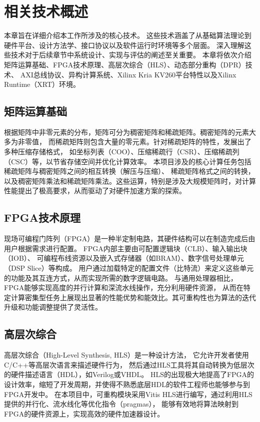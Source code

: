 \chapter{相关技术概述}

本章旨在详细介绍本工作所涉及的核心技术。
这些技术涵盖了从基础算法理论到硬件平台、设计方法学、接口协议以及软件运行时环境等多个层面。
深入理解这些技术对于后续章节中系统设计、实现与评估的阐述至关重要。
本章将依次介绍矩阵运算基础、FPGA技术原理、高层次综合（HLS）、动态部分重构（DPR）技术、
AXI总线协议、异构计算系统、Xilinx Kria KV260平台特性以及Xilinx Runtime（XRT）环境。

\section{矩阵运算基础}

根据矩阵中非零元素的分布，矩阵可分为稠密矩阵和稀疏矩阵。稠密矩阵的元素大多为非零值，
而稀疏矩阵则包含大量的零元素。针对稀疏矩阵的特性，发展出了多种压缩存储格式，
如坐标列表（COO）、压缩稀疏行（CSR）、压缩稀疏列（CSC）等，以节省存储空间并优化计算效率。
本项目涉及的核心计算任务包括稀疏矩阵与稠密矩阵之间的相互转换（解压与压缩）、
稀疏矩阵格式之间的转换，以及稠密矩阵乘法和稀疏矩阵乘法。这些运算，特别是涉及大规模矩阵时，对计算性能提出了极高要求，从而驱动了对硬件加速方案的探索。

\section{FPGA技术原理}

现场可编程门阵列（FPGA）是一种半定制电路，其硬件结构可以在制造完成后由用户根据需求进行配置。
FPGA内部主要由可配置逻辑块（CLB）、输入输出块（IOB）、
可编程布线资源以及嵌入式存储器（如BRAM）、数字信号处理单元（DSP Slice）等构成。
用户通过加载特定的配置文件（比特流）来定义这些单元的功能及其互连方式，从而实现所需的数字逻辑电路。
与通用处理器相比，FPGA能够实现高度的并行计算和深流水线操作，充分利用硬件资源，
从而在特定计算密集型任务上展现出显著的性能优势和能效比。其可重构性也为算法的迭代升级和功能调整提供了灵活性。

\section{高层次综合}

高层次综合（High-Level Synthesis, HLS）是一种设计方法，
它允许开发者使用C/C++等高层次语言来描述硬件行为，
然后通过HLS工具将其自动转换为低层次的硬件描述语言（HDL），如Verilog或VHDL。
HLS的出现极大地提高了FPGA的设计效率，缩短了开发周期，并使得不熟悉底层HDL的软件工程师也能够参与到FPGA开发中。
在本项目中，可重构模块采用Vitis HLS进行编写，通过利用HLS提供的并行化、流水线化等优化指令（pragmas），
能够有效地将算法映射到FPGA的硬件资源上，实现高效的硬件加速器设计。

